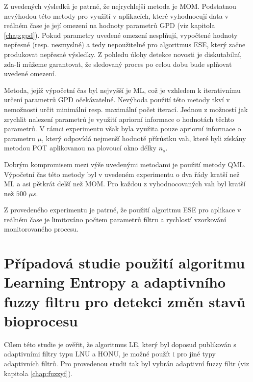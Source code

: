 Z uvedených výsledků je patrné, že nejrychlejší metoda je MOM. Podstatnou nevýhodou této metody pro využití v aplikacích, které vyhodnocují data v reálném čase je její omezení na hodnoty parametrů GPD (viz kapitola \ref{chap:gpd}). Pokud parametry uvedené omezení nesplňují, vypočtené hodnoty nepřesné (resp. nesmyslné) a tedy nepoužitelné pro algoritmus ESE, který začne produkovat nepřesné výsledky. Z pohledu úlohy detekce novosti je diskutabilní, zda-li můžeme garantovat, že sledovaný proces po celou dobu bude splňovat uvedené omezení.
\par
Metoda, jejíž výpočetní čas byl nejvyšší je ML, což je vzhledem k iterativnímu určení parametrů GPD očekávatelné. Nevýhoda použití této metody tkví v  nemožnosti určit minimální resp. maximální počet iterací. Jednou z možností jak zrychlit nalezení parametrů je využití apriorní informace o hodnotách těchto parametrů. V rámci experimentu však byla využita pouze apriorní informace o parametru $\mu$, který odpovídá nejmenší hodnotě přírůstku vah, které byli získány metodou POT aplikovanou na plovoucí okno délky $n_s$.
\par
Dobrým kompromisem mezi výše uvedenými metodami je použití metody QML. Výpočetní čas této metody byl v uvedeném experimentu o dva řády kratší než ML a asi pětkrát delší než MOM. Pro každou z vyhodnocovaných vah byl kratší než $500$ $\mu s$.
\par 
Z provedeného experimentu je patrné, že použití algoritmu ESE pro aplikace v reálném čase je limitováno počtem parametrů filtru a rychlostí vzorkování monitorovaného procesu. 





\section{Případová studie použití algoritmu Learning Entropy a adaptivního fuzzy filtru pro detekci změn stavů bioprocesu} \label{chap:LE_fuzzy}
Cílem této studie je ověřit, že algoritmus LE, který byl doposud publikován s adaptivními filtry typu LNU a HONU, je možné použít i pro jiné typy adaptivních filtrů. Pro provedenou studii tak byl vybrán adaptivní fuzzy filtr (viz kapitola \ref{chap:fuzzyf}).
